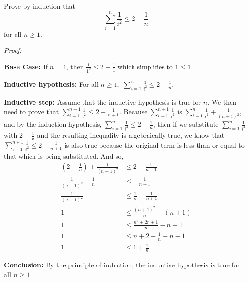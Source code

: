 \documentclass[10pt]{article}
\begin{document}
\begin{flushleft}
Prove by induction that $$\sum\limits_{i=1}^n \frac{1}{i^2}\leq 2- \frac{1}{n}$$ for all $n \geq 1$. 
\end{flushleft}
\textit{Proof:}


\begin{flushleft}
\textbf{Base Case:} If $n=1$, then $\frac{1}{1^2}  \leq 2 - \frac{1}{1}$ which simplifies to $1 \leq 1$
\end{flushleft}



\begin{flushleft}
\textbf{Inductive hypothesis:} For all $n\geq 1,$ $\sum\limits_{i=1}^n \frac{1}{i^2}\leq 2- \frac{1}{n}$.
\end{flushleft}

\begin{flushleft}
\textbf{Inductive step:} Assume that the inductive hypothesis is true for $n$. We then need to prove that $\sum\limits_{i=1}^{n+1} \frac{1}{i^2}\leq 2- \frac{1}{n+1}$. Because $\sum\limits_{i=1}^{n+1} \frac{1}{i^2}$ is $\sum\limits_{i=1}^n \frac{1}{i^2} + \frac{1}{(n+1)^2}$, and by the induction hypothesis, $\sum\limits_{i=1}^n \frac{1}{i^2}\leq 2- \frac{1}{n}$, then if we substitute $\sum\limits_{i=1}^n \frac{1}{i^2}$ with $2- \frac{1}{n}$ and the resulting inequality is algebraically true, we know that $\sum\limits_{i=1}^{n+1} \frac{1}{i^2}\leq 2- \frac{1}{n+1}$ is also true because the original term is less than or equal to that which is being substituted. And so,
\begin{align}
(2- \frac{1}{n}) + \frac{1}{(n+1)^2} &\leq 2- \frac{1}{n+1}\\
\frac{1}{(n+1)^2} - \frac{1}{n} &\leq -\frac{1}{n+1} \\
\frac{1}{(n+1)^2} &\leq \frac{1}{n} -\frac{1}{n+1} \\
1 &\leq \frac{(n+1)^2}{n} -(n+1)\\
1 &\leq \frac{n^2+2n+1}{n}-n-1\\
1 &\leq n+2+\frac{1}{n} -n-1\\
1 &\leq 1+\frac{1}{n}
\end{align}

\end{flushleft}

\begin{flushleft}
\textbf{Conclusion:} By the principle of induction, the inductive hypothesis is true for all $n \geq 1$
\end{flushleft}

\begin{flushleft}

\end{flushleft}
\end{document}
